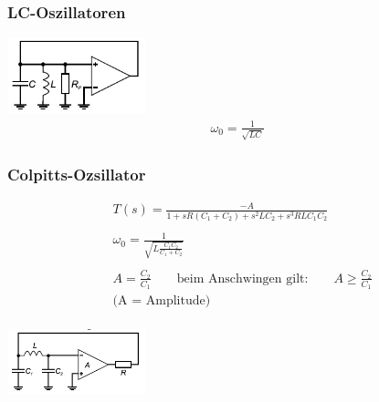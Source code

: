 \begin{multicols}{3}
\subsubsection{LC-Oszillatoren}
	\includegraphics[width=0.3\textwidth]{images/LC-Oszillator}
	\begin{equation*} 
        \begin{split} 
          \omega_0=\frac{1}{\sqrt{LC}}
        \end{split} 
    \end{equation*}
    \hfill \columnbreak
    
    \subsubsection{Colpitts-Ozsillator}
    \begin{equation*} 
        \begin{split} 
            &T(s) = \frac{-A}{1+sR(C_1+C_2)+s^2LC_2+s^3RLC_1C_2}\\\\
            &\omega _0 = \frac{1}{\sqrt{L\frac{C_1 C_2}{C_1+C_2}}}\\\\
            &A =\frac{C_2}{C_1} \quad \quad \text{beim Anschwingen gilt:} \quad \quad A \geq\frac{C_2}{C_1} \\
            &\text{(A = Amplitude)} \\
        \end{split} 
    \end{equation*}
    
    \includegraphics[width=0.3\textwidth]{images/Colpitts-Oszillator}
    \hfill \columnbreak
\end{multicols}

\FloatBarrier
